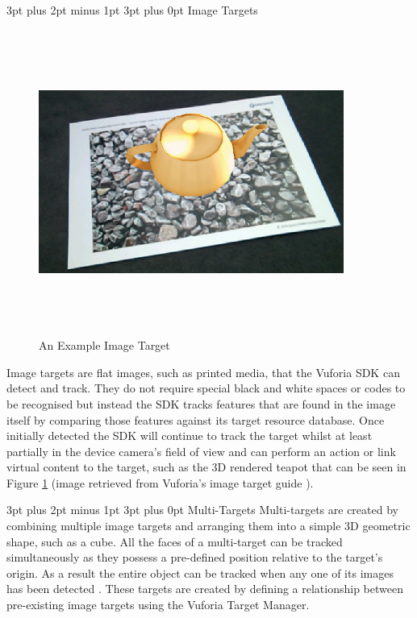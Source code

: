 \documentclass[12pt,a4paper]{article}
\makeatletter
\renewcommand\paragraph{\@startsection {paragraph}{1}{0mm} %
	                           {3pt plus 2pt minus 1pt} %
	                           {3pt plus 0pt} %
	                           {\normalfont}}
\makeatother
\begin{document}
\paragraph{Image Targets}

\begin{figure}[!h]
	\centering
	\includegraphics[width=10cm,height=10cm,keepaspectratio]{images/imagetarget}
	\caption{An Example Image Target}
	\label{fig_imagetarget}
\end{figure}

Image targets are flat images, such as printed media, that the Vuforia SDK can detect and track. They do not require special black and white spaces or codes to be recognised but instead the SDK tracks features that are found in the image itself by comparing those features against its target resource database. Once initially detected the SDK will continue to track the target whilst at least partially in the device camera's field of view and can perform an action or link virtual content to the target, such as the 3D rendered teapot that can be seen in Figure \ref{fig_imagetarget} (image retrieved from Vuforia's image target guide \cite{vuforiaimagetargets}).

\paragraph{Multi-Targets}
Multi-targets are created by combining multiple image targets and arranging them into a simple 3D geometric shape, such as a cube. All the faces of a multi-target can be tracked simultaneously as they possess a pre-defined position relative to the target's origin. As a result the entire object can be tracked when any one of its images has been detected  \cite{vuforiamultitargets}. These targets are created by defining a relationship between pre-existing image targets using the Vuforia Target Manager.
\end{document}
